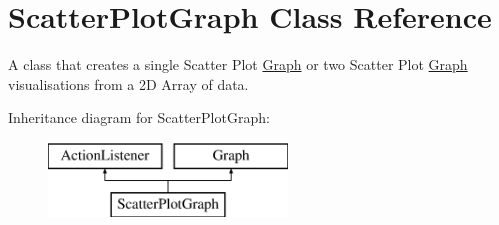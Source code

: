 \hypertarget{class_scatter_plot_graph}{\section{Scatter\-Plot\-Graph Class Reference}
\label{class_scatter_plot_graph}
}


A class that creates a single Scatter Plot \hyperlink{interface_graph}{Graph} or two Scatter Plot \hyperlink{interface_graph}{Graph} visualisations from a 2\-D Array of data.  


Inheritance diagram for Scatter\-Plot\-Graph\-:\begin{figure}[H]
\begin{center}
\leavevmode
\includegraphics[height=2.000000cm]{class_scatter_plot_graph}
\end{center}
\end{figure}

